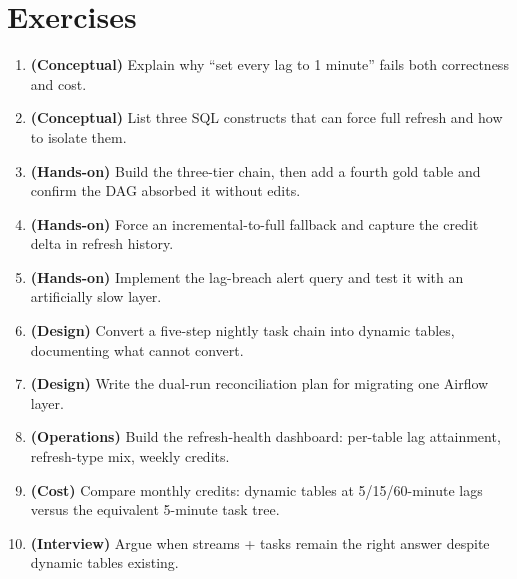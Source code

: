 \section{Exercises}
\begin{enumerate}
    \item \textbf{(Conceptual)} Explain why ``set every lag to 1 minute'' fails both correctness and cost.
    \item \textbf{(Conceptual)} List three SQL constructs that can force full refresh and how to isolate them.
    \item \textbf{(Hands-on)} Build the three-tier chain, then add a fourth gold table and confirm the DAG absorbed it without edits.
    \item \textbf{(Hands-on)} Force an incremental-to-full fallback and capture the credit delta in refresh history.
    \item \textbf{(Hands-on)} Implement the lag-breach alert query and test it with an artificially slow layer.
    \item \textbf{(Design)} Convert a five-step nightly task chain into dynamic tables, documenting what cannot convert.
    \item \textbf{(Design)} Write the dual-run reconciliation plan for migrating one Airflow layer.
    \item \textbf{(Operations)} Build the refresh-health dashboard: per-table lag attainment, refresh-type mix, weekly credits.
    \item \textbf{(Cost)} Compare monthly credits: dynamic tables at 5/15/60-minute lags versus the equivalent 5-minute task tree.
    \item \textbf{(Interview)} Argue when streams + tasks remain the right answer despite dynamic tables existing.
\end{enumerate}
